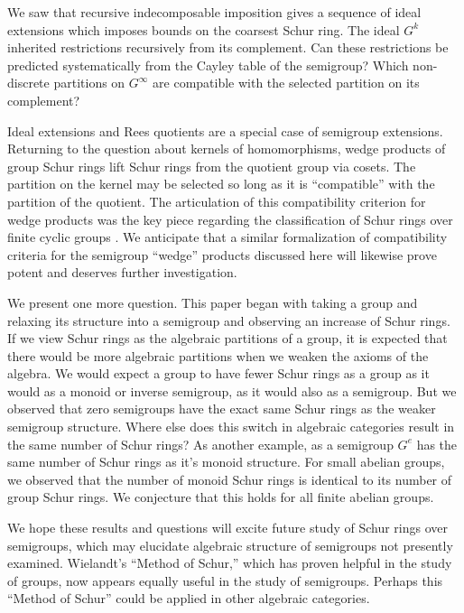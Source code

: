 \documentclass{article}
\theoremstyle{plain}
\theoremstyle{definition}
\begin{document}
We saw that recursive indecomposable imposition gives a sequence of ideal extensions which imposes bounds on the coarsest Schur ring. The ideal $G^k$ inherited restrictions recursively from its complement. Can these restrictions be predicted systematically from the Cayley table of the semigroup? Which non-discrete partitions on $G^\infty$ are compatible with the selected partition on its complement?

Ideal extensions and Rees quotients are a special case of semigroup extensions. Returning to the question about kernels of homomorphisms, wedge products of group Schur rings lift Schur rings from the quotient group via cosets. The partition on the kernel may be selected so long as it is ``compatible'' with the partition of the quotient. The articulation of this compatibility criterion for wedge products was the key piece regarding the classification of Schur rings over finite cyclic groups \cite{LeungII, LeungI}. We anticipate that a similar formalization of compatibility criteria for the semigroup ``wedge'' products discussed here will likewise prove potent and deserves further investigation.

We present one more question. This paper began with taking a group and relaxing its structure into a semigroup and observing an increase of Schur rings. If we view Schur rings as the algebraic partitions of a group, it is expected that there would be more algebraic partitions when we weaken the axioms of the algebra. We would expect a group to have fewer Schur rings as a group as it would as a monoid or inverse semigroup, as it would also as a semigroup. But we observed that zero semigroups have the exact same Schur rings as the weaker semigroup structure. Where else does this switch in algebraic categories result in the same number of Schur rings? As another example, as a semigroup $G^e$ has the same number of Schur rings as it's monoid structure. For small abelian groups, we observed that the number of monoid Schur rings is identical to its number of group Schur rings. We conjecture that this holds for all finite abelian groups.

We hope these results and questions will excite future study of Schur rings over semigroups, which may elucidate algebraic structure of semigroups not presently examined. Wielandt's ``Method of Schur,'' which has proven helpful in the study of groups, now appears equally useful in the study of semigroups. Perhaps this ``Method of Schur'' could be applied in other algebraic categories. 
\end{document}
